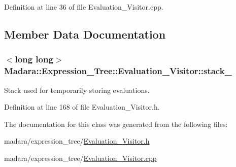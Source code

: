 Definition at line 36 of file Evaluation\_\-Visitor.cpp.



\subsection{Member Data Documentation}
\hypertarget{classMadara_1_1Expression__Tree_1_1Evaluation__Visitor_a1d83cf18c9cc232176789d95e322b9f1}{
\subsubsection[{stack\_\-}]{$<$long long$>$ {\bf Madara::Expression\_\-Tree::Evaluation\_\-Visitor::stack\_\-}}}
\label{d5/db2/classMadara_1_1Expression__Tree_1_1Evaluation__Visitor_a1d83cf18c9cc232176789d95e322b9f1}


Stack used for temporarily storing evaluations. 



Definition at line 168 of file Evaluation\_\-Visitor.h.



The documentation for this class was generated from the following files:\begin{DoxyCompactItemize}
\item 
madara/expression\_\-tree/\hyperlink{Evaluation__Visitor_8h}{Evaluation\_\-Visitor.h}\item 
madara/expression\_\-tree/\hyperlink{Evaluation__Visitor_8cpp}{Evaluation\_\-Visitor.cpp}\end{DoxyCompactItemize}
